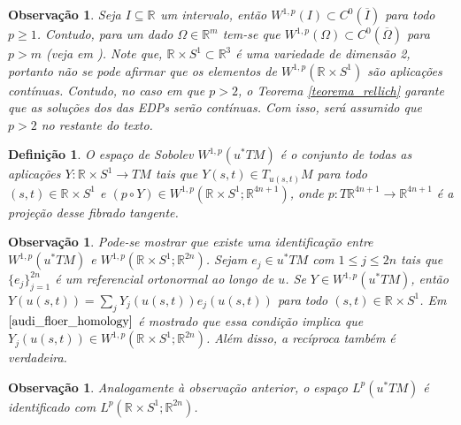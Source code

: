 \documentclass[12pt]{book}
\newtheorem{definicao}[teorema]{Definição}
\newtheorem{observacao}[teorema]{Observação}
\newcommand{\circulo}{S^{1}}
\newcommand{\espacoLp}[1]{L^{p}(#1)}
\newcommand{\espacoLpcontradominio}[2]{L^{p}(#1;#2)}
\newcommand{\espacosobolev}[1]{W^{1,p}(#1)}
\newcommand{\espacosobolevcontradominio}[2]{W^{1,p}(#1;#2)}
\newcommand{\espacotangenteponto}[2]{T_{#1}#2}
\newcommand{\pullbackfibradotangente}[2]{#1^{*}T#2}
\newcommand{\pullbackfibradotangenteM}[1]{\pullbackfibradotangente{#1}{M}}
\newcommand{\retacartesianocirculo}{\real{} \times \circulo}
\newcommand{\real}[1]{\mathbb{R}^{#1}}
\newcommand{\reta}{\real{}}
\begin{document}
	\begin{observacao}
		Seja $I\subseteq \reta$ um intervalo, então $\espacosobolev{I} \subset C^{0}(\overline{I})$ para todo $p\geq 1$. Contudo, para um dado $\Omega \in \real{m}$ tem-se que $\espacosobolev{\Omega} \subset C^{0}(\overline{\Omega})$ para $p>m$ (veja em \cite{audi_floer_homology}). Note que, $\retacartesianocirculo \subset \real{3}$ é uma variedade de dimensão 2, portanto não se pode afirmar que os elementos de $\espacosobolev{\retacartesianocirculo}$ são aplicações contínuas. Contudo, no caso em que $p>2$, o Teorema \ref{teorema_rellich} garante que as soluções dos das EDPs serão contínuas. Com isso, será assumido que $p>2$ no restante do texto. 
	\end{observacao}
	
	\begin{definicao}
		O espaço de Sobolev $\espacosobolev{\pullbackfibradotangenteM{u}} $ é o conjunto de todas as aplicações $Y:\retacartesianocirculo\to TM$ tais que $Y(s,t) \in \espacotangenteponto{u(s,t)}{M}$ para todo $(s,t) \in \retacartesianocirculo$ e $(p\circ Y) \in \espacosobolevcontradominio{\retacartesianocirculo}{\real{4n+1}}$, onde $p:T\real{4n+1} \to \real{4n+1}$ é a projeção desse fibrado tangente. 
	\end{definicao}
	
	\begin{observacao}\label{observacao_identificacao_espaco_sobolev}
		Pode-se mostrar que existe uma identificação entre  $\espacosobolev{\pullbackfibradotangenteM{u}}$ e $\espacosobolevcontradominio{\retacartesianocirculo}{\real{2n}}$. Sejam $e_{j} \in \pullbackfibradotangenteM{u}$ com $1\leq j\leq 2n$ tais que $\{e_{j} \}_{j=1}^{2n}$ é um referencial ortonormal ao longo de $u$. Se $Y \in \espacosobolev{\pullbackfibradotangenteM{u}}$, então $Y(u(s,t)) = \sum_{j} Y_{j}(u(s,t))e_{j}(u(s,t))$ para todo $(s,t) \in \retacartesianocirculo$. Em $\cite{audi_floer_homology}$ é mostrado que essa condição implica que $Y_{j}(u(s,t)) \in \espacosobolevcontradominio{\retacartesianocirculo}{\real{2n}}$. Além disso, a recíproca também é verdadeira.
	\end{observacao}
	
	\begin{observacao}\label{observacao_identificacao_espaco_Lp}
		Analogamente à observação anterior, o espaço $\espacoLp{\pullbackfibradotangenteM{u}}$ é identificado com $\espacoLpcontradominio{\retacartesianocirculo}{\real{2n}}$.
	\end{observacao}
	
\end{document}
